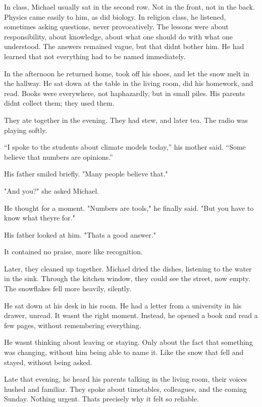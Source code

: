 \documentclass[
]{article}
\begin{document}
In class, Michael usually sat in the second row. Not in the front, not in the back. Physics came easily to him, as did biology. In religion class, he listened, sometimes asking questions, never provocatively. The lessons were about responsibility, about knowledge, about what one should do with what one understood. The answers remained vague, but that didn\textquotesingle t bother him. He had learned that not everything had to be named immediately.

In the afternoon he returned home, took off his shoes, and let the snow melt in the hallway. He sat down at the table in the living room, did his homework, and read. Books were everywhere, not haphazardly, but in small piles. His parents didn\textquotesingle t collect them; they used them.

They ate together in the evening. They had stew, and later tea. The radio was playing softly.

``I spoke to the students about climate models today,'' his mother said. ``Some believe that numbers are opinions.''

His father smiled briefly. "Many people believe that."

"And you?" she asked Michael.

He thought for a moment. "Numbers are tools," he finally said. "But you have to know what they\textquotesingle re for."

His father looked at him. "That\textquotesingle s a good answer."

It contained no praise, more like recognition.

Later, they cleaned up together. Michael dried the dishes, listening to the water in the sink. Through the kitchen window, they could see the street, now empty. The snowflakes fell more heavily, silently.

He sat down at his desk in his room. He had a letter from a university in his drawer, unread. It wasn\textquotesingle t the right moment. Instead, he opened a book and read a few pages, without remembering everything.

He wasn\textquotesingle t thinking about leaving or staying. Only about the fact that something was changing, without him being able to name it. Like the snow that fell and stayed, without being asked.

Late that evening, he heard his parents talking in the living room, their voices hushed and familiar. They spoke about timetables, colleagues, and the coming Sunday. Nothing urgent. That\textquotesingle s precisely why it felt so reliable.
\end{document}
